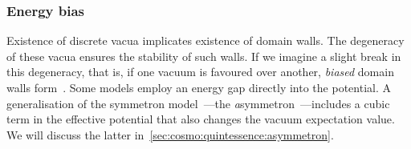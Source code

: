     \subsubsection{Energy bias}
        Existence of discrete vacua implicates existence of domain walls. The degeneracy of these vacua ensures the stability of such walls. If we imagine a slight break in this degeneracy, that is, if one vacuum is favoured over another, \emph{biased} domain walls form~\citep{vachaspatiKinksDomainWalls2006}.  Some models employ an energy gap directly into the potential. A generalisation of the symmetron model~\citep{hinterbichlerSymmetronCosmology2011}---the \emph{a}symmetron~\citep{perivolaropoulosGravitationalTransitionsExplicitly2022}---includes a cubic term in the effective potential that also changes the vacuum expectation value. We will discuss the latter in~\cref{sec:cosmo:quintessence:asymmetron}.







    



    
    




    